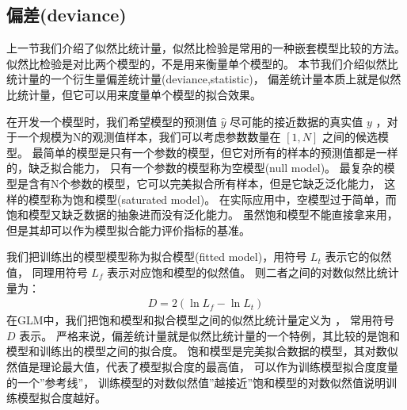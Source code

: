 \documentclass[letterpaper,10pt,english]{sphinxmanual}
\begin{document}
\subsection{偏差(deviance)}
\label{\detokenize{_u6a21_u578b_u8bc4_u4f30/content:deviance}}
上一节我们介绍了似然比统计量，似然比检验是常用的一种嵌套模型比较的方法。
似然比检验是对比两个模型的，不是用来衡量单个模型的。
本节我们介绍似然比统计量的一个衍生量\sphinxhyphen{}偏差统计量(deviance,statistic)，
偏差统计量本质上就是似然比统计量，但它可以用来度量单个模型的拟合效果。

在开发一个模型时，我们希望模型的预测值 \(\hat{y}\) 尽可能的接近数据的真实值 \(y\)
，对于一个规模为N的观测值样本，我们可以考虑参数数量在 \([1,N]\) 之间的候选模型。
最简单的模型是只有一个参数的模型，但它对所有的样本的预测值都是一样的，缺乏拟合能力，
只有一个参数的模型称为空模型(null model)。
最复杂的模型是含有N个参数的模型，它可以完美拟合所有样本，但是它缺乏泛化能力，
这样的模型称为饱和模型(saturated model)。
在实际应用中，空模型过于简单，而饱和模型又缺乏数据的抽象进而没有泛化能力。
虽然饱和模型不能直接拿来用，但是其却可以作为模型拟合能力评价指标的基准。

我们把训练出的模型模型称为拟合模型(fitted model)，用符号 \(L_t\) 表示它的似然值，
同理用符号 \(L_f\) 表示对应饱和模型的似然值。
则二者之间的对数似然比统计量为：
\begin{equation}\label{equation:模型评估/content:eq_me_051}
\begin{split}D  = 2(\ln L_f - \ln L_t)\end{split}
\end{equation}
在GLM中，我们把饱和模型和拟合模型之间的似然比统计量定义为 ，
常用符号 \(D\) 表示。
严格来说，偏差统计量就是似然比统计量的一个特例，其比较的是饱和模型和训练出的模型之间的拟合度。
饱和模型是完美拟合数据的模型，其对数似然值是理论最大值，代表了模型拟合度的最高值，
可以作为训练模型拟合度度量的一个”参考线”，
训练模型的对数似然值”越接近”饱和模型的对数似然值说明训练模型拟合度越好。
\end{document}
